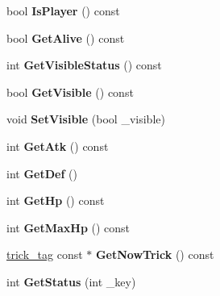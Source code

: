 \begin{DoxyCompactItemize}
\item 
bool {\bfseries Is\+Player} () const \hypertarget{class_c_actor_aae1a50d017aa77b7a49eb78c2e8e3763}{}\label{class_c_actor_aae1a50d017aa77b7a49eb78c2e8e3763}

\item 
bool {\bfseries Get\+Alive} () const \hypertarget{class_c_actor_aa59b20d55ebf6052b24ebd62e8408f70}{}\label{class_c_actor_aa59b20d55ebf6052b24ebd62e8408f70}

\item 
int {\bfseries Get\+Visible\+Status} () const \hypertarget{class_c_actor_a5c12c729269aaebb111a511f70a37a1c}{}\label{class_c_actor_a5c12c729269aaebb111a511f70a37a1c}

\item 
bool {\bfseries Get\+Visible} () const \hypertarget{class_c_actor_a614c99a06241d60e3f4f76b69062bf43}{}\label{class_c_actor_a614c99a06241d60e3f4f76b69062bf43}

\item 
void {\bfseries Set\+Visible} (bool \+\_\+visible)\hypertarget{class_c_actor_a6b52a3a18435cc3c3c20940aadbb2b2e}{}\label{class_c_actor_a6b52a3a18435cc3c3c20940aadbb2b2e}

\item 
int {\bfseries Get\+Atk} () const \hypertarget{class_c_actor_a638d017fe2e6a9fe88b1e4f685ffedbd}{}\label{class_c_actor_a638d017fe2e6a9fe88b1e4f685ffedbd}

\item 
int {\bfseries Get\+Def} ()\hypertarget{class_c_actor_a583ce9ec2f0868fa4793a3441bc196d8}{}\label{class_c_actor_a583ce9ec2f0868fa4793a3441bc196d8}

\item 
int {\bfseries Get\+Hp} () const \hypertarget{class_c_actor_a99584b792244713fa540f45e9267f4c3}{}\label{class_c_actor_a99584b792244713fa540f45e9267f4c3}

\item 
int {\bfseries Get\+Max\+Hp} () const \hypertarget{class_c_actor_a33abdda7a572c5c58120fbf17e68ab74}{}\label{class_c_actor_a33abdda7a572c5c58120fbf17e68ab74}

\item 
\hyperlink{structtrick__tag}{trick\+\_\+tag} const $\ast$ {\bfseries Get\+Now\+Trick} () const \hypertarget{class_c_actor_aa286c738d69e5ae35686a6892e002789}{}\label{class_c_actor_aa286c738d69e5ae35686a6892e002789}

\item 
int {\bfseries Get\+Status} (int \+\_\+key)\hypertarget{class_c_actor_a2e6c26854a8be12e0af07fec2016183c}{}\label{class_c_actor_a2e6c26854a8be12e0af07fec2016183c}


\end{DoxyCompactItemize}
